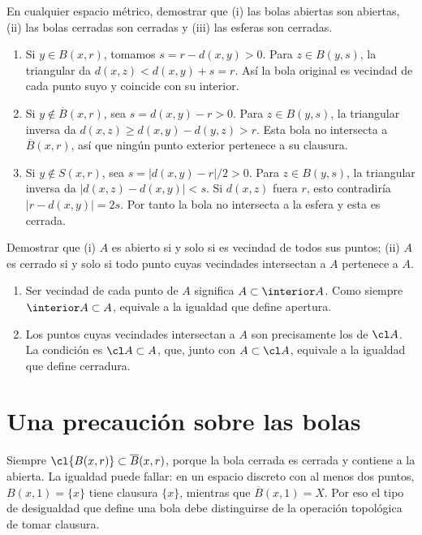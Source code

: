 \begin{ejercicio}
En cualquier espacio métrico, demostrar que (i) las bolas abiertas son abiertas, (ii) las bolas cerradas son cerradas y (iii) las esferas son cerradas.
\end{ejercicio}
\begin{solucion}
\begin{enumerate}[label=(\roman*)]
\item Si $y\in B(x,r)$, tomamos $s=r-d(x,y)>0$. Para $z\in B(y,s)$, la triangular da $d(x,z)<d(x,y)+s=r$. Así la bola original es vecindad de cada punto suyo y coincide con su interior.
\item Si $y\notin\overline B(x,r)$, sea $s=d(x,y)-r>0$. Para $z\in B(y,s)$, la triangular inversa da $d(x,z)\ge d(x,y)-d(y,z)>r$. Esta bola no intersecta a $\overline B(x,r)$, así que ningún punto exterior pertenece a su clausura.
\item Si $y\notin S(x,r)$, sea $s=|d(x,y)-r|/2>0$. Para $z\in B(y,s)$, la triangular inversa da $|d(x,z)-d(x,y)|<s$. Si $d(x,z)$ fuera $r$, esto contradiría $|r-d(x,y)|=2s$. Por tanto la bola no intersecta a la esfera y esta es cerrada.
\end{enumerate}
\end{solucion}

\begin{ejercicio}
Demostrar que (i) $A$ es abierto si y solo si es vecindad de todos sus puntos; (ii) $A$ es cerrado si y solo si todo punto cuyas vecindades intersectan a $A$ pertenece a $A$.
\end{ejercicio}
\begin{solucion}
\begin{enumerate}[label=(\roman*)]
\item Ser vecindad de cada punto de $A$ significa $A\subset\interior A$. Como siempre $\interior A\subset A$, equivale a la igualdad que define apertura.
\item Los puntos cuyas vecindades intersectan a $A$ son precisamente los de $\cl A$. La condición es $\cl A\subset A$, que, junto con $A\subset\cl A$, equivale a la igualdad que define cerradura.
\end{enumerate}
\end{solucion}

\section{Una precaución sobre las bolas}
Siempre $\cl{B(x,r)}\subset\overline B(x,r)$, porque la bola cerrada es cerrada y contiene a la abierta. La igualdad puede fallar: en un espacio discreto con al menos dos puntos, $B(x,1)=\{x\}$ tiene clausura $\{x\}$, mientras que $\overline B(x,1)=X$. Por eso el tipo de desigualdad que define una bola debe distinguirse de la operación topológica de tomar clausura.
